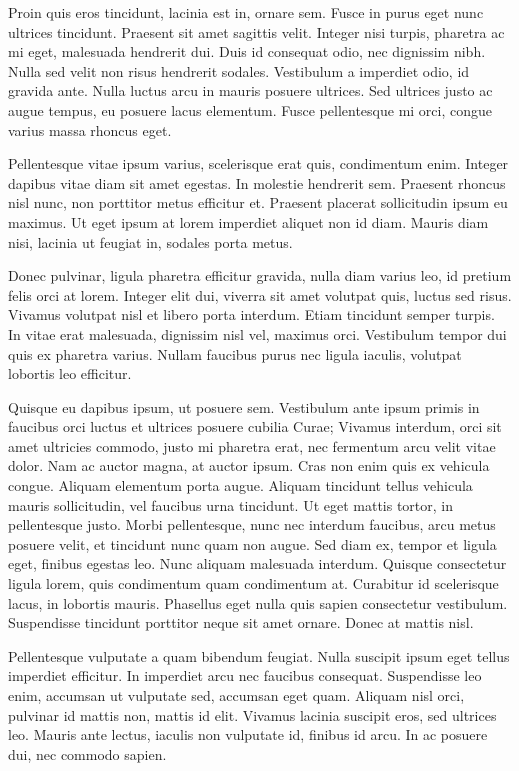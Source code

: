 Proin quis eros tincidunt, lacinia est in, ornare sem. Fusce in purus eget nunc ultrices tincidunt. Praesent sit amet sagittis velit. Integer nisi turpis, pharetra ac mi eget, malesuada hendrerit dui. Duis id consequat odio, nec dignissim nibh. Nulla sed velit non risus hendrerit sodales. Vestibulum a imperdiet odio, id gravida ante. Nulla luctus arcu in mauris posuere ultrices. Sed ultrices justo ac augue tempus, eu posuere lacus elementum. Fusce pellentesque mi orci, congue varius massa rhoncus eget.

Pellentesque vitae ipsum varius, scelerisque erat quis, condimentum enim. Integer dapibus vitae diam sit amet egestas. In molestie hendrerit sem. Praesent rhoncus nisl nunc, non porttitor metus efficitur et. Praesent placerat sollicitudin ipsum eu maximus. Ut eget ipsum at lorem imperdiet aliquet non id diam. Mauris diam nisi, lacinia ut feugiat in, sodales porta metus.

Donec pulvinar, ligula pharetra efficitur gravida, nulla diam varius leo, id pretium felis orci at lorem. Integer elit dui, viverra sit amet volutpat quis, luctus sed risus. Vivamus volutpat nisl et libero porta interdum. Etiam tincidunt semper turpis. In vitae erat malesuada, dignissim nisl vel, maximus orci. Vestibulum tempor dui quis ex pharetra varius. Nullam faucibus purus nec ligula iaculis, volutpat lobortis leo efficitur.

Quisque eu dapibus ipsum, ut posuere sem. Vestibulum ante ipsum primis in faucibus orci luctus et ultrices posuere cubilia Curae; Vivamus interdum, orci sit amet ultricies commodo, justo mi pharetra erat, nec fermentum arcu velit vitae dolor. Nam ac auctor magna, at auctor ipsum. Cras non enim quis ex vehicula congue. Aliquam elementum porta augue. Aliquam tincidunt tellus vehicula mauris sollicitudin, vel faucibus urna tincidunt. Ut eget mattis tortor, in pellentesque justo. Morbi pellentesque, nunc nec interdum faucibus, arcu metus posuere velit, et tincidunt nunc quam non augue. Sed diam ex, tempor et ligula eget, finibus egestas leo. Nunc aliquam malesuada interdum. Quisque consectetur ligula lorem, quis condimentum quam condimentum at. Curabitur id scelerisque lacus, in lobortis mauris. Phasellus eget nulla quis sapien consectetur vestibulum. Suspendisse tincidunt porttitor neque sit amet ornare. Donec at mattis nisl.

Pellentesque vulputate a quam bibendum feugiat. Nulla suscipit ipsum eget tellus imperdiet efficitur. In imperdiet arcu nec faucibus consequat. Suspendisse leo enim, accumsan ut vulputate sed, accumsan eget quam. Aliquam nisl orci, pulvinar id mattis non, mattis id elit. Vivamus lacinia suscipit eros, sed ultrices leo. Mauris ante lectus, iaculis non vulputate id, finibus id arcu. In ac posuere dui, nec commodo sapien.

